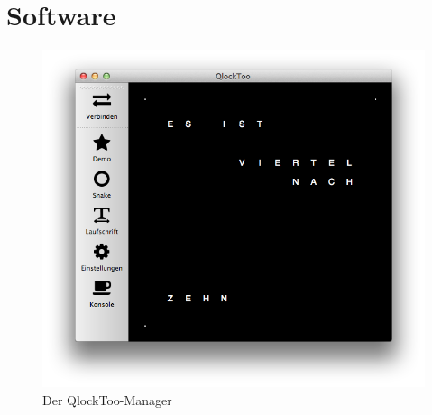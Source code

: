 \section{Software}
\label{sec:Software}

\begin{figure}[t]
    \centering
    \includegraphics[width=.7\textwidth]{Abbildungen/Software/Manager}
    \caption[QlockToo-Manager]{Der QlockToo-Manager}
    \label{fig:Manager}
\end{figure}

